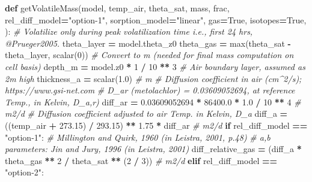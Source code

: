 \documentclass[]{article}
\newenvironment{Shaded}{\begin{snugshade}}{\end{snugshade}}
\newcommand{\KeywordTok}[1]{\textcolor[rgb]{0.13,0.29,0.53}{\textbf{#1}}}
\newcommand{\DecValTok}[1]{\textcolor[rgb]{0.00,0.00,0.81}{#1}}
\newcommand{\FloatTok}[1]{\textcolor[rgb]{0.00,0.00,0.81}{#1}}
\newcommand{\StringTok}[1]{\textcolor[rgb]{0.31,0.60,0.02}{#1}}
\newcommand{\CommentTok}[1]{\textcolor[rgb]{0.56,0.35,0.01}{\textit{#1}}}
\newcommand{\VariableTok}[1]{\textcolor[rgb]{0.00,0.00,0.00}{#1}}
\newcommand{\ControlFlowTok}[1]{\textcolor[rgb]{0.13,0.29,0.53}{\textbf{#1}}}
\newcommand{\OperatorTok}[1]{\textcolor[rgb]{0.81,0.36,0.00}{\textbf{#1}}}
\newcommand{\BuiltInTok}[1]{#1}
\newcommand{\NormalTok}[1]{#1}
\begin{document}
\begin{Shaded}
\begin{Highlighting}[]
\KeywordTok{def}\NormalTok{ getVolatileMass(model, temp_air, theta_sat, mass, frac,}
\NormalTok{                    rel_diff_model}\OperatorTok{=}\StringTok{"option-1"}\NormalTok{, sorption_model}\OperatorTok{=}\StringTok{"linear"}\NormalTok{,}
\NormalTok{                    gas}\OperatorTok{=}\VariableTok{True}\NormalTok{, isotopes}\OperatorTok{=}\VariableTok{True}\NormalTok{, ):}
    \CommentTok{# Volatilize only during peak volatilization time i.e., first 24 hrs, @Prueger2005.}
\NormalTok{    theta_layer }\OperatorTok{=}\NormalTok{ model.theta_z0}
\NormalTok{    theta_gas }\OperatorTok{=} \BuiltInTok{max}\NormalTok{(theta_sat }\OperatorTok{-}\NormalTok{ theta_layer, scalar(}\DecValTok{0}\NormalTok{))}
    \CommentTok{# Convert to m (needed for final mass computation on cell basis)}
\NormalTok{    depth_m }\OperatorTok{=}\NormalTok{ model.z0 }\OperatorTok{*} \DecValTok{1} \OperatorTok{/} \DecValTok{10} \OperatorTok{**} \DecValTok{3}
    \CommentTok{# Air boundary layer, assumed as 2m high}
\NormalTok{    thickness_a }\OperatorTok{=}\NormalTok{ scalar(}\FloatTok{1.0}\NormalTok{)  }\CommentTok{# m}
    \CommentTok{# Diffusion coefficient in air (cm^2/s); https://www.gsi-net.com}
    \CommentTok{#  D_ar (metolachlor) = 0.03609052694,  at reference Temp., in Kelvin, D_a,r)}
\NormalTok{    diff_ar }\OperatorTok{=} \FloatTok{0.03609052694} \OperatorTok{*} \FloatTok{86400.0} \OperatorTok{*} \FloatTok{1.0} \OperatorTok{/} \DecValTok{10} \OperatorTok{**} \DecValTok{4}  \CommentTok{# m2/d}
    \CommentTok{# Diffusion coefficient adjusted to air Temp. in Kelvin, D_a}
\NormalTok{    diff_a }\OperatorTok{=}\NormalTok{ ((temp_air }\OperatorTok{+} \FloatTok{273.15}\NormalTok{) }\OperatorTok{/} \FloatTok{293.15}\NormalTok{) }\OperatorTok{**} \FloatTok{1.75} \OperatorTok{*}\NormalTok{ diff_ar  }\CommentTok{# m2/d}
    \ControlFlowTok{if}\NormalTok{ rel_diff_model }\OperatorTok{==} \StringTok{"option-1"}\NormalTok{:}
        \CommentTok{# Millington and Quirk, 1960 (in Leistra, 2001, p.48)}
        \CommentTok{# a,b parameters: Jin and Jury, 1996 (in Leistra, 2001)}
\NormalTok{        diff_relative_gas }\OperatorTok{=}\NormalTok{ (diff_a }\OperatorTok{*}\NormalTok{ theta_gas }\OperatorTok{**} \DecValTok{2} \OperatorTok{/}
\NormalTok{                             theta_sat }\OperatorTok{**}\NormalTok{ (}\DecValTok{2} \OperatorTok{/} \DecValTok{3}\NormalTok{))  }\CommentTok{# m2/d}
    \ControlFlowTok{elif}\NormalTok{ rel_diff_model }\OperatorTok{==} \StringTok{"option-2"}\NormalTok{:}

\end{Highlighting}
\end{Shaded}
\end{document}
